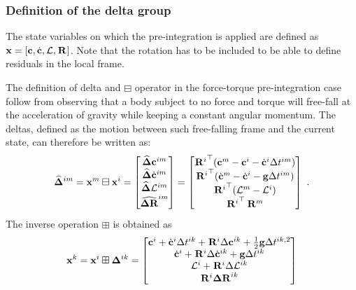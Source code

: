 \subsubsection{Definition of the delta group}

The state variables on which the pre-integration is applied are defined as ${\bf x}=[{\bf c}, \dot{{\bf c}}, \mathcal{L}, \prescript{}{}{{\bf R}}_{}]$.
Note that the rotation has to be included to be able to define residuals in the local frame.

The definition of delta and $\boxminus$ operator in the force-torque pre-integration case follow from observing that a body subject to no force and torque will free-fall at the acceleration of gravity while keeping a constant angular momentum. The deltas, defined as the motion between such free-falling frame and the current state, can therefore be written as:
%
\begin{equation}
    \widehat{{{\bm \Delta}}}^{im} = {\bf x}^m \boxminus {\bf x}^i =
    \begin{bmatrix}
        \widehat{{{\bm \Delta}}}{\bf c}^{im} \\ \widehat{{{\bm \Delta}}}\dot{{\bf c}}^{im} \\ \widehat{{{\bm \Delta}}}\mathcal{L}^{im} \\ \widehat{{\bm \Delta {\bf R}}}^{im}
    \end{bmatrix}
    =
    \begin{bmatrix}
        {\prescript{}{}{{\bf R}}_{}^i}^{\top} ({\bf c}^m - {\bf c}^i - \dot{{\bf c}}^i \Delta t^{im})
        \\
        {\prescript{}{}{{\bf R}}_{}^i}^{\top} (\dot{{\bf c}}^{m} - \dot{{\bf c}}^{i} - {\bf g} \Delta t^{im})
        \\
        {\prescript{}{}{{\bf R}}_{}^i}^{\top} (\mathcal{L}^{m} - \mathcal{L}^{i})
        \\
        {\prescript{}{}{{\bf R}}_{}^i}^{\top} \prescript{}{}{{\bf R}}_{}^m
    \end{bmatrix}~.
    \label{eq:com_boxminus}
\end{equation}
%
The inverse operation $\boxplus$ is obtained as
%
\begin{equation}
    {\bf x}^k = {\bf x}^i \boxplus {{\bm \Delta}}^{ik} =
    \begin{bmatrix}
    {\bf c}^i + \dot{{\bf c}}^i \Delta t^{ik} + \prescript{}{}{{\bf R}}_{}^i \Delta {\bf c}^{ik} + \frac{1}{2} {\bf g} \Delta t^{ik,2}
    \\
    \dot{{\bf c}}^i + \prescript{}{}{{\bf R}}_{}^i \Delta \dot{{\bf c}}^{ik} + {\bf g} \Delta t^{ik}
    \\
    \mathcal{L}^i + \prescript{}{}{{\bf R}}_{}^i \Delta \mathcal{L}^{ik}
    \\
    \prescript{}{}{{\bf R}}_{}^i {\bm \Delta {\bf R}}^{ik}
    \end{bmatrix}
\end{equation}


